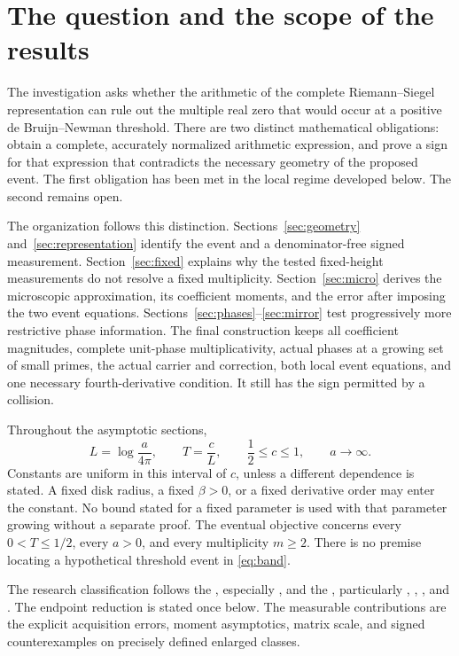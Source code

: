 \section{The question and the scope of the results}\label{sec:scope}

The investigation asks whether the arithmetic of the complete
Riemann--Siegel representation can rule out the multiple real zero that
would occur at a positive de Bruijn--Newman threshold. There are two
distinct mathematical obligations: obtain a complete, accurately
normalized arithmetic expression, and prove a sign for that expression
that contradicts the necessary geometry of the proposed event.
The first obligation has been met in the local regime developed below.
The second remains open.

The organization follows this distinction. Sections~\ref{sec:geometry}
and~\ref{sec:representation} identify the event and a denominator-free
signed measurement. Section~\ref{sec:fixed} explains why the tested
fixed-height measurements do not resolve a fixed multiplicity.
Section~\ref{sec:micro} derives the microscopic approximation, its
coefficient moments, and the error after imposing the two event equations.
Sections~\ref{sec:phases}--\ref{sec:mirror} test progressively more
restrictive phase information. The final construction keeps all
coefficient magnitudes, complete unit-phase multiplicativity, actual
phases at a growing set of small primes, the actual carrier and correction,
both local event equations, and one necessary fourth-derivative condition.
It still has the sign permitted by a collision.

Throughout the asymptotic sections,
\begin{equation}\label{eq:band}
 L=\log\frac{a}{4\pi},\qquad T=\frac cL,\qquad
 \frac12\le c\le1,\qquad a\longrightarrow\infty.
\end{equation}
Constants are uniform in this interval of \(c\), unless a different
dependence is stated. A fixed disk radius, a fixed \(\beta>0\), or a fixed
derivative order may enter the constant. No bound stated for a fixed
parameter is used with that parameter growing without a separate proof.
The eventual objective concerns every \(0<T\le1/2\), every \(a>0\), and
every multiplicity \(m\ge2\). There is no premise locating a hypothetical
threshold event in \eqref{eq:band}.

The research classification follows the
, especially
,
and the , particularly
,
,
,
and .
The endpoint reduction is stated once below. The measurable contributions
are the explicit acquisition errors, moment asymptotics, matrix scale,
and signed counterexamples on precisely defined enlarged classes.

